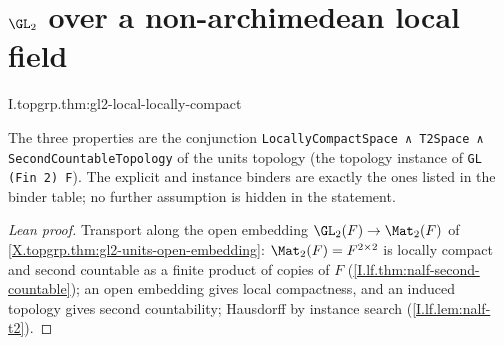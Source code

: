 \section{\texorpdfstring{$\GL_2$ over a non-archimedean local field}{GL₂ over a non-archimedean local field}}
\begin{theorem}
\end{theorem}
\begin{tfformal}{I.topgrp.thm:gl2-local-locally-compact}
\begin{tffidelity}
The three properties are the conjunction \texttt{LocallyCompactSpace ∧ T2Space ∧ SecondCountableTopology} of the units topology (the topology instance of \texttt{GL (Fin 2) F}). The explicit and instance binders are exactly the ones listed in the binder table; no further assumption is hidden in the statement.
\end{tffidelity}
\end{tfformal}
\begin{proof}[Lean proof]
Transport along the open embedding $\GL_2(F)\to\Mat_2(F)$ of \cref{X.topgrp.thm:gl2-units-open-embedding}: $\Mat_2(F)=F^{2\times2}$ is locally compact and second countable as a finite product of copies of $F$ (\cref{I.lf.thm:nalf-second-countable}); an open embedding gives local compactness, and an induced topology gives second countability; Hausdorff by instance search (\cref{I.lf.lem:nalf-t2}).
\end{proof}

